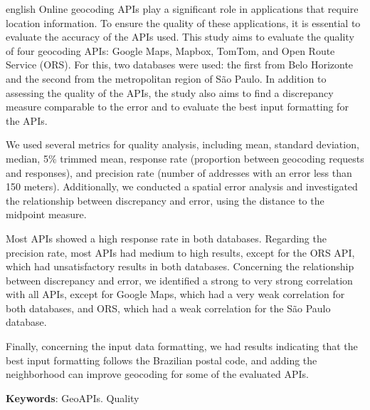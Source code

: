 \begin{resumo}[Abstract]
 \begin{otherlanguage*}{english}
  Online geocoding APIs play a significant role in applications that require location information. To ensure the quality of these applications, it is essential to evaluate the accuracy of the APIs used. This study aims to evaluate the quality of four geocoding APIs: Google Maps, Mapbox, TomTom, and Open Route Service (ORS). For this, two databases were used: the first from Belo Horizonte and the second from the metropolitan region of São Paulo. In addition to assessing the quality of the APIs, the study also aims to find a discrepancy measure comparable to the error and to evaluate the best input formatting for the APIs.

  We used several metrics for quality analysis, including mean, standard deviation, median, 5\% trimmed mean, response rate (proportion between geocoding requests and responses), and precision rate (number of addresses with an error less than 150 meters). Additionally, we conducted a spatial error analysis and investigated the relationship between discrepancy and error, using the distance to the midpoint measure.
  
  Most APIs showed a high response rate in both databases. Regarding the precision rate, most APIs had medium to high results, except for the ORS API, which had unsatisfactory results in both databases. Concerning the relationship between discrepancy and error, we identified a strong to very strong correlation with all APIs, except for Google Maps, which had a very weak correlation for both databases, and ORS, which had a weak correlation for the São Paulo database.
  
  Finally, concerning the input data formatting, we had results indicating that the best input formatting follows the Brazilian postal code, and adding the neighborhood can improve geocoding for some of the evaluated APIs.

   \vspace{\onelineskip}
   \noindent 
   \textbf{Keywords}: GeoAPIs. Quality
 \end{otherlanguage*}
\end{resumo}